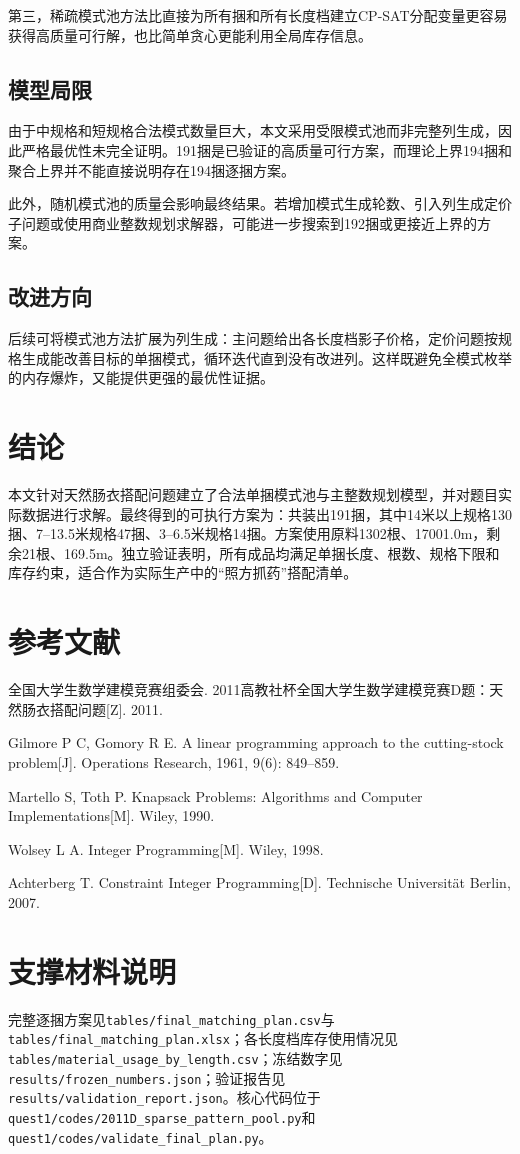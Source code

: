 \documentclass[UTF8,a4paper,12pt]{ctexart}
\begin{document}
第三，稀疏模式池方法比直接为所有捆和所有长度档建立CP-SAT分配变量更容易获得高质量可行解，也比简单贪心更能利用全局库存信息。

\subsection{模型局限}
由于中规格和短规格合法模式数量巨大，本文采用受限模式池而非完整列生成，因此严格最优性未完全证明。191捆是已验证的高质量可行方案，而理论上界194捆和聚合上界并不能直接说明存在194捆逐捆方案。

此外，随机模式池的质量会影响最终结果。若增加模式生成轮数、引入列生成定价子问题或使用商业整数规划求解器，可能进一步搜索到192捆或更接近上界的方案。

\subsection{改进方向}
后续可将模式池方法扩展为列生成：主问题给出各长度档影子价格，定价问题按规格生成能改善目标的单捆模式，循环迭代直到没有改进列。这样既避免全模式枚举的内存爆炸，又能提供更强的最优性证据。

\section{结论}
本文针对天然肠衣搭配问题建立了合法单捆模式池与主整数规划模型，并对题目实际数据进行求解。最终得到的可执行方案为：共装出191捆，其中14米以上规格130捆、7--13.5米规格47捆、3--6.5米规格14捆。方案使用原料1302根、17001.0m，剩余21根、169.5m。独立验证表明，所有成品均满足单捆长度、根数、规格下限和库存约束，适合作为实际生产中的“照方抓药”搭配清单。

\section*{参考文献}
\begin{enumerate}[label={[{\arabic*}]}]
  \item 全国大学生数学建模竞赛组委会. 2011高教社杯全国大学生数学建模竞赛D题：天然肠衣搭配问题[Z]. 2011.
  \item Gilmore P C, Gomory R E. A linear programming approach to the cutting-stock problem[J]. Operations Research, 1961, 9(6): 849--859.
  \item Martello S, Toth P. Knapsack Problems: Algorithms and Computer Implementations[M]. Wiley, 1990.
  \item Wolsey L A. Integer Programming[M]. Wiley, 1998.
  \item Achterberg T. Constraint Integer Programming[D]. Technische Universit\"at Berlin, 2007.
\end{enumerate}

\appendix
\section{支撑材料说明}
完整逐捆方案见\texttt{tables/final\_matching\_plan.csv}与\texttt{tables/final\_matching\_plan.xlsx}；各长度档库存使用情况见\texttt{tables/material\_usage\_by\_length.csv}；冻结数字见\texttt{results/frozen\_numbers.json}；验证报告见\texttt{results/validation\_report.json}。核心代码位于\texttt{quest1/codes/2011D\_sparse\_pattern\_pool.py}和\texttt{quest1/codes/validate\_final\_plan.py}。
\end{document}
